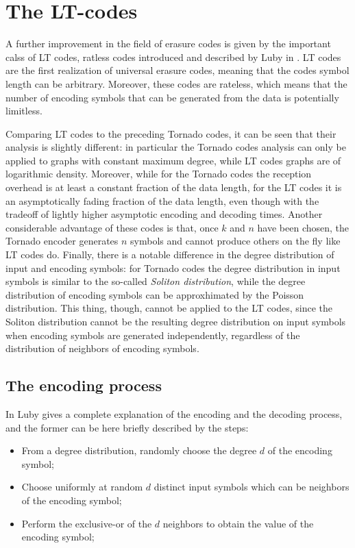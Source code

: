 \section{The LT-codes}
A further improvement in the field of erasure codes is given by the important calss of LT codes, ratless codes introduced and described by Luby in \cite{Luby}. LT codes are the first realization of universal erasure codes, meaning that the codes symbol length can be arbitrary. Moreover, these codes are rateless, which means that the number of encoding symbols that can be generated from the data is potentially limitless.

Comparing LT codes to the preceding Tornado codes, it can be seen that their analysis is slightly different: in particular the Tornado codes analysis can only be applied to graphs with constant maximum degree, while LT codes graphs are of logarithmic density. Moreover, while for the Tornado codes the reception overhead is at least a constant fraction of the data length, for the LT codes it is an asymptotically fading fraction of the data length, even though with the tradeoff of lightly higher asymptotic encoding and decoding times. Another considerable advantage of these codes is that, once $k$ and $n$ have been chosen, the Tornado encoder generates $n$ symbols and cannot produce others on the fly like LT codes do. Finally, there is a notable difference in the degree distribution of input and encoding symbols: for Tornado codes the degree distribution in input symbols is similar to the so-called \textit{Soliton distribution}, while the degree distribution of encoding symbols can be approxhimated by the Poisson distribution. This thing, though, cannot be applied to the LT codes, since the Soliton distribution cannot be the resulting degree distribution on input symbols when encoding symbols are generated independently, regardless of the distribution of neighbors of encoding symbols.
\cite{Luby}

\subsection{The encoding process}
In \cite{Luby} Luby gives a complete explanation of the encoding and the decoding process, and the former can be here briefly described by the steps:
\begin{itemize}
  \item From a degree distribution, randomly choose the degree $d$ of the encoding symbol;
  \item Choose uniformly at random $d$ distinct input symbols which can be neighbors of the encoding symbol;
  \item Perform the exclusive-or of the $d$ neighbors to obtain the value of the encoding symbol;
\end{itemize}

